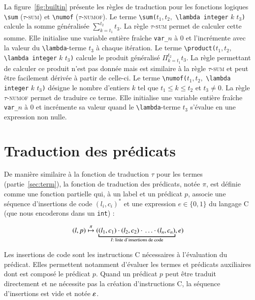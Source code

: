 La figure~\ref{fig:builtin} présente les règles de traduction pour les fonctions
logiques \lstinline'\sum' (\textsc{$\tau$-sum}) et \lstinline'\numof'
(\textsc{$\tau$-numof}).
Le terme \lstinline'\sum('$t_1, t_2,$ \lstinline'\lambda integer' $k$\semicolon
$t_3$\lstinline')' calcule la somme généralisée $\sum_{k = t_1}^{t_2}t_3$.
La règle \textsc{$\tau$-sum} permet de calculer cette somme.
Elle initialise une variable entière fraîche \lstinline'var_'$n$ à $0$ et
l'incrémente avec la valeur du \lstinline'\lambda'-terme $t_3$ à chaque
itération.
Le terme \lstinline'\product('$t_1, t_2,$ \lstinline'\lambda integer' $k$
\semicolon $t_3$\lstinline')' calcule le produit généralisé
$\Pi_{k = t_1}^{t_2}t_3$.
La règle permettant de calculer ce produit n'est pas donnée mais est similaire à
la règle \textsc{$\tau$-sum} et peut être facilement dérivée à partir de
celle-ci.
Le terme \lstinline'\numof('$t_1, t_2,$ \lstinline'\lambda integer' $k$
\semicolon $t_3$\lstinline')' désigne le nombre d'entiers $k$ tel que
$t_1 \le k \le t_2$ et $t_3 \neq 0$.
La règle \textsc{$\tau$-numof} permet de traduire ce terme.
Elle initialise une variable entière fraîche \lstinline'var_'$n$ à $0$ et
incrémente sa valeur quand le \lstinline'\lambda'-terme $t_3$
s'évalue en une expression non nulle.


\section{Traduction des prédicats \eacsl}
\label{sec:pred}


De manière similaire à la fonction de traduction $\tau$ pour les termes
(partie~\ref{sec:term}), la fonction de traduction des prédicats, notée $\pi$,
est définie comme une fonction partielle qui, à un label et un prédicat \eacsl
$p$, associe une séquence d'insertions de code $(l_i, c_i)^*$ et une
expression $e \in \{0, 1\}$ du langage C (que nous encoderons
dans un \lstinline'int') :

\[
(l, p) \prule
(\underbracket{(l_1, c_1) \concat (l_2, c_2) \concat \ldots
  \concat (l_n, c_n)}_{I : \text{ liste d'insertions de code}}, e)
\]

Les insertions de code sont les instructions C nécessaires à l'évaluation du
prédicat.
Elles permettent notamment d'évaluer les termes et prédicats
auxiliaires dont est composé le prédicat $p$.
Quand un prédicat $p$ peut être traduit directement et ne nécessite
pas la création d'instructions C, la séquence d'insertions est vide et notée
$\varepsilon$.

